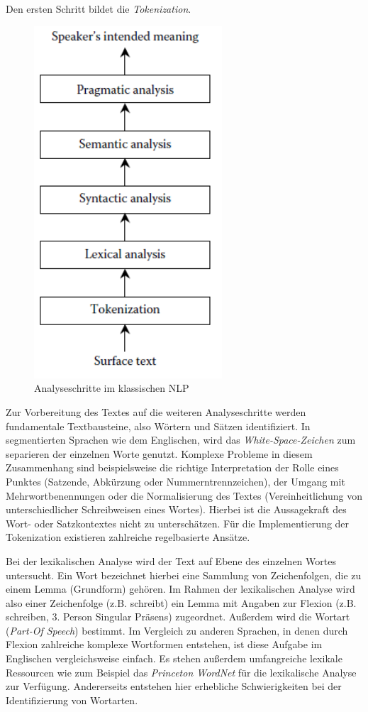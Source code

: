 Den ersten Schritt bildet die \textit{Tokenization}.\begin{figure}
\includegraphics[width=7cm]{pictures/Analyseschritte.png}
\caption{Analyseschritte im klassischen NLP}
\label{fig:STEPS}
\end{figure} Zur Vorbereitung des Textes auf die weiteren Analyseschritte werden fundamentale Textbausteine, also Wörtern und Sätzen identifiziert. In segmentierten Sprachen wie dem Englischen, wird das \textit{White-Space-Zeichen} zum separieren der einzelnen Worte genutzt. Komplexe Probleme in diesem Zusammenhang sind beispielsweise die richtige Interpretation der Rolle eines Punktes (Satzende, Abkürzung oder Nummerntrennzeichen), der Umgang mit Mehrwortbenennungen oder die Normalisierung des Textes (Vereinheitlichung von unterschiedlicher Schreibweisen eines Wortes).  Hierbei ist die Aussagekraft des Wort- oder Satzkontextes nicht zu unterschätzen. Für die Implementierung der Tokenization existieren zahlreiche regelbasierte Ansätze.\par
Bei der lexikalischen Analyse wird der Text auf Ebene des einzelnen Wortes untersucht. Ein Wort bezeichnet hierbei eine Sammlung von Zeichenfolgen, die zu einem Lemma (Grundform) gehören. Im Rahmen der lexikalischen Analyse wird also einer Zeichenfolge (z.B. schreibt) ein Lemma mit Angaben zur Flexion (z.B. schreiben, 3. Person Singular Präsens) zugeordnet. Außerdem wird die Wortart (\textit{Part-Of Speech}) bestimmt. Im Vergleich zu anderen Sprachen, in denen durch Flexion zahlreiche komplexe Wortformen entstehen, ist diese Aufgabe im Englischen vergleichsweise einfach. Es stehen außerdem umfangreiche lexikale Ressourcen wie zum Beispiel das \textit{Princeton WordNet} für die lexikalische Analyse zur Verfügung. Andererseits entstehen hier erhebliche Schwierigkeiten bei der Identifizierung von Wortarten.\par
